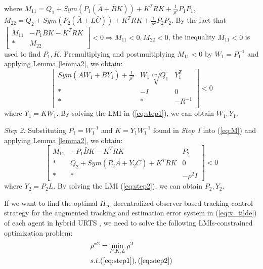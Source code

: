 \documentclass[journal,12pt,onecolumn,draftclsnofoot,]{IEEEtran}
\begin{document}
where $M_{11}=Q_1+Sym(P_1(\bar{A}+\bar{B}K)) + K^TRK + \frac{1}{\rho^2}P_1P_1$, $M_{22}=Q_2+Sym(P_2(\bar{A}+L\bar{C})) + K^TRK + \frac{1}{\rho^2}P_2P_2$. By the fact that $\begin{bmatrix}
    M_{11} & -P_1\bar{B}K - K^TRK \\ * & M_{22}
\end{bmatrix} < 0 \Rightarrow M_{11}<0, M_{22}<0$, the inequality $M_{11}<0$ is used to find $P_1,K$. Premultiplying and
postmultiplying $M_{11}<0$ by $W_1=P_1^{-1}$ and applying Lemma \ref{lemma2}, we obtain:
\begin{equation} \label{eq:step1}
    \begin{bmatrix}
        Sym(\bar{A}W_1+\bar{B}Y_1) + \frac{1}{\rho^2} & W_1\sqrt[1/2]{Q_1} & Y_1^T \\
        * & -I & 0\\
        * & * & -R^{-1}\\
    \end{bmatrix} < 0
\end{equation}
where $Y_1=KW_1$. By solving the LMI in (\ref{eq:step1}), we can obtain $W_1,Y_1$.

\textit{Step 2:} Substituting $P_1=W_1^{-1}$ and $K=Y_1W_1^{-1}$ found in \textit{Step 1} into (\ref{eq:M}) and applying Lemma \ref{lemma2}, we obtain:
\begin{equation} \label{eq:step2}
    \begin{bmatrix}
        M_{11} & -P_1\bar{B}K - K^TRK & P_2 \\
        * & Q_2+Sym(P_2\bar{A}+Y_2\bar{C}) + K^TRK & 0 \\
        * & * & -\rho^2I
    \end{bmatrix} < 0
\end{equation}
where $Y_2=P_2L$. By solving the LMI (\ref{eq:step2}), we can obtain $P_2,Y_2$.


If we want to find the optimal $H_\infty$ decentralized observer-based tracking control strategy for the augmented tracking and estimation error system in (\ref{eq:x_tilde}) of each agent in hybrid URTS , we need to solve the following LMIs-constrained optimization problem:
\begin{equation} \label{LMI constraint}
    \begin{split}
        & \rho^{*2}=\mathop{\min}_{P,K,L} \rho^2 \\
        & s.t. (\refeq{eq:step1}),(\refeq{eq:step2}) 
    \end{split}
\end{equation}
\end{document}
